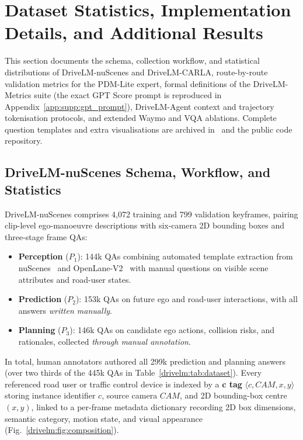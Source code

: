 \section{Dataset Statistics, Implementation Details, and Additional Results}\label{app:drivelm}\label{drivelm:app:impact}

This section documents the schema, collection workflow, and statistical distributions of DriveLM-nuScenes and DriveLM-CARLA, route-by-route validation metrics for the PDM-Lite expert, formal definitions of the DriveLM-Metrics suite (the exact GPT Score prompt is reproduced in Appendix~\ref{app:supp:gpt_prompt}), DriveLM-Agent context and trajectory tokenisation protocols, and extended Waymo and VQA ablations. Complete question templates and extra visualisations are archived in~\cite{sima2024drivelm} and the public code repository.

\subsection{DriveLM-nuScenes Schema, Workflow, and Statistics}\label{drivelm:app:questions}\label{drivelm:app:nuscenes}\label{drivelm:app:nus_composition}\label{drivelm:app:nus_collection}\label{drivelm:app:nus_stats}

DriveLM-nuScenes comprises 4,072 training and 799 validation keyframes, pairing clip-level ego-manoeuvre descriptions with six-camera 2D bounding boxes and three-stage frame QAs:
\begin{itemize}
  \item \textbf{Perception} ($P_1$): 144k QAs combining automated template extraction from nuScenes~\cite{caesar2020nuscenes} and OpenLane-V2~\cite{wang2023openlanev2} with manual questions on visible scene attributes and road-user states.
  \item \textbf{Prediction} ($P_2$): 153k QAs on future ego and road-user interactions, with all answers \emph{written manually}.
  \item \textbf{Planning} ($P_3$): 146k QAs on candidate ego actions, collision risks, and rationales, collected \emph{through manual annotation}.
\end{itemize}
In total, human annotators authored all 299k prediction and planning answers (over two thirds of the 445k QAs in Table~\ref{drivelm:tab:dataset}). Every referenced road user or traffic control device is indexed by a \textbf{c tag} $\langle c, \mathit{CAM}, x, y\rangle$ storing instance identifier $c$, source camera $\mathit{CAM}$, and 2D bounding-box centre $(x, y)$, linked to a per-frame metadata dictionary recording 2D box dimensions, semantic category, motion state, and visual appearance (Fig.~\ref{drivelm:fig:composition}).

